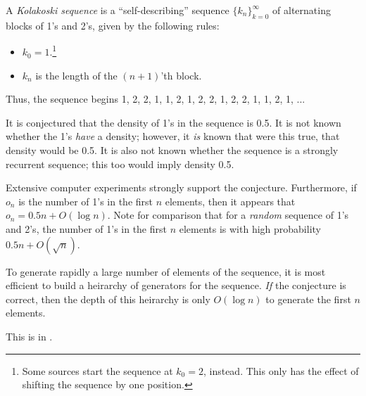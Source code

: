 \documentclass[12pt]{article}
\begin{document}
A \emph{Kolakoski sequence} is a ``self-describing'' sequence
$\{k_n\}_{k=0}^{\infty}$ of alternating blocks of 1's and 2's,
given by the following rules:
\begin{itemize}
\item $k_0=1$.\footnote{Some sources start the sequence at $k_0=2$, instead.  This only has the effect of shifting the sequence by one position.}
\item $k_n$ is the length of the $(n+1)$'th block.
\end{itemize}

Thus, the sequence begins 1, 2, 2, 1, 1, 2, 1, 2, 2, 1, 2, 2, 1, 1, 2, 1, ...

It is conjectured that the density of 1's in the sequence is 0.5.  It is not known whether the 1's \emph{have} a density; however, it \emph{is} known that were this true, that density would be 0.5.  It is also not known whether the sequence is a strongly recurrent sequence; this too would imply density 0.5.

Extensive computer experiments strongly support the conjecture.  Furthermore, if $o_n$ is the number of 1's in the first $n$ elements, then it appears that
$o_n = 0.5n + O(\log n)$.  Note for comparison that for a \emph{random} sequence of 1's and 2's, the number of 1's in the first $n$ elements is with high probability
$0.5n + O(\sqrt{n})$.

To generate rapidly a large number of elements of the sequence, it is most efficient to build a heirarchy of generators for the sequence.  \emph{If} the conjecture is correct, then the depth of this heirarchy is only $O(\log n)$ to generate the first $n$ elements.

This is 
in .
\end{document}
